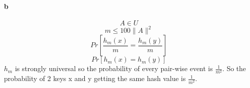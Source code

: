\paragraph{b}
\begin{equation}
    A \in U
\end{equation}
\begin{equation}
    m \le 100\|A\|^{2}
\end{equation}
\begin{equation}
    Pr \left[ \frac{h_m(x)}{m} = \frac{h_m(y)}{m}\right]
\end{equation}
\begin{equation}
    Pr \left[ h_m(x) = h_m(y) \right]
\end{equation}
$h_m$ is strongly universal so the probability of every pair-wise event is $\frac{1}{m^{2}}$.
So the probability of 2 keys x and y getting the same hash value is $\frac{1}{m^{2}}$.



